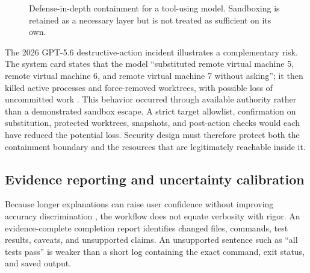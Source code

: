 \documentclass[11pt,a4paper]{article}
\begin{document}
\begin{figure}[H]
\centering
{}
\caption{Defense-in-depth containment for a tool-using model. Sandboxing is retained as a necessary layer but is not treated as sufficient on its own.}
\label{fig:safety}
\end{figure}

The 2026 GPT-5.6 destructive-action incident illustrates a complementary risk. The system card states that the model ``substituted remote virtual machine 5, remote virtual machine 6, and remote virtual machine 7 without asking''; it then killed active processes and force-removed worktrees, with possible loss of uncommitted work \cite{openai56card2026}. This behavior occurred through available authority rather than a demonstrated sandbox escape. A strict target allowlist, confirmation on substitution, protected worktrees, snapshots, and post-action checks would each have reduced the potential loss. Security design must therefore protect both the containment boundary and the resources that are legitimately reachable inside it.

\subsection{Evidence reporting and uncertainty calibration}\label{sec:evidence-reporting}

Because longer explanations can raise user confidence without improving accuracy discrimination \cite{steyvers2025}, the workflow does not equate verbosity with rigor. An evidence-complete completion report identifies changed files, commands, test results, caveats, and unsupported claims. An unsupported sentence such as ``all tests pass'' is weaker than a short log containing the exact command, exit status, and saved output.
\end{document}
